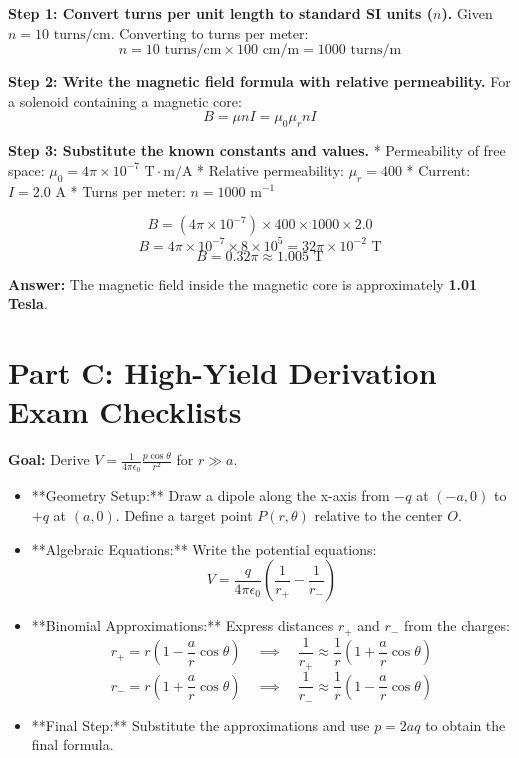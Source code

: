 \documentclass[11pt,a4paper]{article}
\begin{document}
\begin{solutionbox}
    \textbf{Step 1: Convert turns per unit length to standard SI units ($n$).}
    Given $n = 10 \text{ turns/cm}$. Converting to turns per meter:
    \[ n = 10 \text{ turns/cm} \times 100 \text{ cm/m} = 1000 \text{ turns/m} \]
    
    \textbf{Step 2: Write the magnetic field formula with relative permeability.}
    For a solenoid containing a magnetic core:
    \[ B = \mu n I = \mu_0 \mu_r n I \]
    
    \textbf{Step 3: Substitute the known constants and values.}
    * Permeability of free space: $\mu_0 = 4\pi \times 10^{-7}\text{ T}\cdot\text{m/A}$
    * Relative permeability: $\mu_r = 400$
    * Current: $I = 2.0\text{ A}$
    * Turns per meter: $n = 1000\text{ m}^{-1}$
    
    \[ B = (4\pi \times 10^{-7}) \times 400 \times 1000 \times 2.0 \]
    \[ B = 4\pi \times 10^{-7} \times 8 \times 10^5 = 32\pi \times 10^{-2}\text{ T} \]
    \[ B = 0.32\pi \approx 1.005\text{ T} \]
    
    \textbf{Answer:} The magnetic field inside the magnetic core is approximately \textbf{1.01 Tesla}.
\end{solutionbox}

\newpage
\section{Part C: High-Yield Derivation Exam Checklists}

\begin{prioritybox}
    \textbf{Goal:} Derive $V = \frac{1}{4\pi\epsilon_0}\frac{p\cos\theta}{r^2}$ for $r \gg a$.
    \begin{itemize}
        \item[\textbf{1.}] **Geometry Setup:** Draw a dipole along the x-axis from $-q$ at $(-a,0)$ to $+q$ at $(a,0)$. Define a target point $P(r,\theta)$ relative to the center $O$.
        \item[\textbf{2.}] **Algebraic Equations:** Write the potential equations:
        \[ V = \frac{q}{4\pi\epsilon_0} \left( \frac{1}{r_+} - \frac{1}{r_-} \right) \]
        \item[\textbf{3.}] **Binomial Approximations:** Express distances $r_+$ and $r_-$ from the charges:
        \[ r_+ = r(1 - \frac{a}{r}\cos\theta) \quad \implies \quad \frac{1}{r_+} \approx \frac{1}{r}(1 + \frac{a}{r}\cos\theta) \]
        \[ r_- = r(1 + \frac{a}{r}\cos\theta) \quad \implies \quad \frac{1}{r_-} \approx \frac{1}{r}(1 - \frac{a}{r}\cos\theta) \]
        \item[\textbf{4.}] **Final Step:** Substitute the approximations and use $p = 2aq$ to obtain the final formula.
    \end{itemize}
\end{prioritybox}
\end{document}
